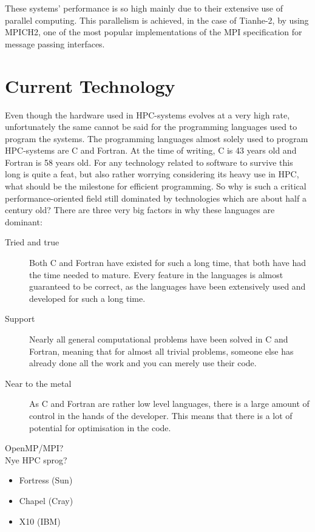 These systems' performance is so high mainly due to their extensive use of parallel computing. This parallelism is achieved, in the case of Tianhe-2, by using MPICH2, one of the most popular implementations of the MPI specification for message passing interfaces.

\section{Current Technology}
Even though the hardware used in HPC-systems evolves at a very high rate, unfortunately the same cannot be said for the programming languages used to program the systems. The programming languages almost solely used to program HPC-systems are C and Fortran. At the time of writing, C is 43 years old and Fortran is 58 years old. For any technology related to software to survive this long is quite a feat, but also rather worrying considering its heavy use in HPC, what should be the milestone for efficient programming.
So why is such a critical performance-oriented field still dominated by technologies which are about half a century old? There are three very big factors in why these languages are dominant:
\begin{description}
	\item [Tried and true]
	Both C and Fortran have existed for such a long time, that both have had the time needed to mature. Every feature in the languages is almost guaranteed to be correct, as the languages have been extensively used and developed for such a long time.
	\item [Support]
	Nearly all general computational problems have been solved in C and Fortran, meaning that for almost all trivial problems, someone else has already done all the work and you can merely use their code.
	\item [Near to the metal]
	As C and Fortran are rather low level languages, there is a large amount of control in the hands of the developer. This means that there is a lot of potential for optimisation in the code.
\end{description}

OpenMP/MPI?\\
Nye HPC sprog?
\begin{itemize}
	\item Fortress (Sun)
	\item Chapel (Cray)
	\item X10 (IBM)
\end{itemize}
